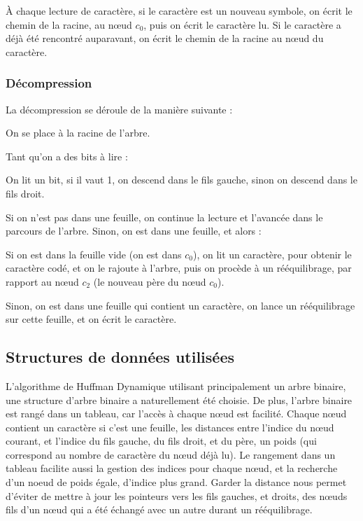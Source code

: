 \documentclass{article}
\begin{document}
\`A chaque lecture de caract\`ere, si le caract\`ere est un nouveau symbole, on \'ecrit le chemin de la racine, au n{\oe}ud $c_0$, puis on \'ecrit le caract\`ere lu.
Si le caract\`ere a d\'ej\`a \'et\'e rencontr\'e auparavant, on \'ecrit le chemin de la racine au n{\oe}ud du caract\`ere.

\subsubsection{D\'ecompression}

La d\'ecompression se d\'eroule de la mani\`ere suivante :

On se place \`a la racine de l'arbre.

Tant qu'on a des bits \`a lire :

On lit un bit, si il vaut 1, on descend dans le fils gauche, sinon on descend dans le fils droit.

Si on n'est pas dans une feuille, on continue la lecture et l'avanc\'ee dans le parcours de l'arbre.
Sinon, on est dans une feuille, et alors :

Si on est dans la feuille vide (on est dans $c_0$), on lit un caract\`ere, pour obtenir le caract\`ere cod\'e, et on le rajoute \`a l'arbre, puis on proc\`ede \`a un r\'e\'equilibrage, par rapport au n{\oe}ud $c_2$ (le nouveau p\`ere du n{\oe}ud $c_0$).

Sinon, on est dans une feuille qui contient un caract\`ere, on lance un r\'e\'equilibrage sur cette feuille, et on \'ecrit le caract\`ere.


\subsection{Structures de donn\'ees utilis\'ees}

L'algorithme de Huffman Dynamique utilisant principalement un arbre binaire, une structure d'arbre binaire a naturellement \'et\'e choisie. De plus, l'arbre binaire est rang\'e dans un tableau, car l'acc\`es \`a chaque n{\oe}ud est facilit\'e. Chaque n{\oe}ud contient un caract\`ere si c'est une feuille, les distances entre l'indice du n{\oe}ud courant, et l'indice du fils gauche, du fils droit, et du p\`ere, un poids (qui correspond au nombre de caract\`ere du n{\oe}ud d\'ej\`a lu). Le rangement dans un tableau facilite aussi la gestion des indices pour chaque n{\oe}ud, et la recherche d'un noeud de poids \'egale, d'indice plus grand. Garder la distance nous permet d'\'eviter de mettre \`a jour les pointeurs vers les fils gauches, et droits, des n{\oe}uds fils d'un n{\oe}ud qui a \'et\'e \'echang\'e avec un autre durant un r\'e\'equilibrage.
 
\end{document}
